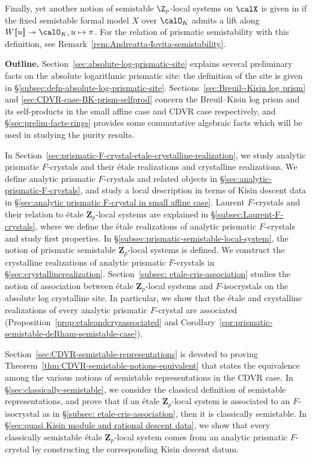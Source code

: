 Finally, yet another notion of semistable $\Z_p$-local systems on $\calX$ is given in \cite{andreatta-iovita-semistable-relative} if the fixed semistable formal model $X$ over $\calO_K$ admits a lift along $W[\![u]\!]\twoheadrightarrow \calO_K, u\mapsto \pi$.
For the relation of prismatic semistability with this definition, see Remark~\ref{rem:Andreatta-Iovita-semistability}.


\medskip \noindent
\textbf{Outline.}  Section~\ref{sec:absolute-log-prismatic-site} explains several preliminary facts on the absolute logarithmic prismatic site: the definition of the site is given in \S\ref{subsec:defn-absolute-log-prismatic-site}. Sections~\ref{sec:Breuil--Kisin log prism} and \ref{sec:CDVR-case-BK-prism-selfprod} concern the Breuil--Kisin log prism and its self-products in the small affine case and CDVR case respectively, and \S\ref{sec:prelim-facts-rings} provides some commutative algebraic facts which will be used in studying the purity results.

In Section~\ref{sec:prismatic-F-crystal-etale-crystalline-realization}, we study analytic prismatic $F$-crystals and their \'etale realizations and crystalline realizations. We define analytic prismatic $F$-crystals and related objects in \S\ref{sec:analytic-prismatic-F-crystals}, and study a local description in terms of Kisin descent data in \S\ref{sec:analytic prismatic F-crystal in small affine case}. Laurent $F$-crystals and their relation to \'etale $\mathbf{Z}_p$-local systems are explained in \S\ref{subsec:Laurent-F-crystals}, where we define the \'etale realizations of analytic prismatic $F$-crystals and study first properties. In \S\ref{subsec:prismatic-semistable-local-system}, the notion of prismatic semistable $\mathbf{Z}_p$-local systems is defined. We construct the crystalline realizations of analytic prismatic $F$-crystals in \S\ref{sec:crystallinerealization}. Section~\ref{subsec: etale-cris-association} studies the notion of association between \'etale $\mathbf{Z}_p$-local systems and $F$-isocrystals on the absolute log crystalline site. In particular, we show that the \'etale and crystalline realizations of every analytic  prismatic $F$-crystal are associated (Proposition~\ref{prop:etaleandcrysassociated} and Corollary~\ref{cor:prismatic-semistable-deRham-semistable-case}).     

Section~\ref{sec:CDVR-semistable-representations} is devoted to proving Theorem~\ref{thm:CDVR-semistable-notions-equivalent} that states the equivalence among the various notions of semistable representations in the CDVR case. In \S\ref{sec:classically-semistable}, we consider the classical definition of semistable representations, and prove that if an \'etale $\mathbf{Z}_p$-local system is associated to an $F$-isocrystal as in \S\ref{subsec: etale-cris-association}, then it is classically semistable. In \S\ref{sec:quasi Kisin module and rational descent data}, we show that every classically semistable \'etale $\mathbf{Z}_p$-local system comes from an analytic prismatic $F$-crystal by constructing the corresponding Kisin descent datum.

